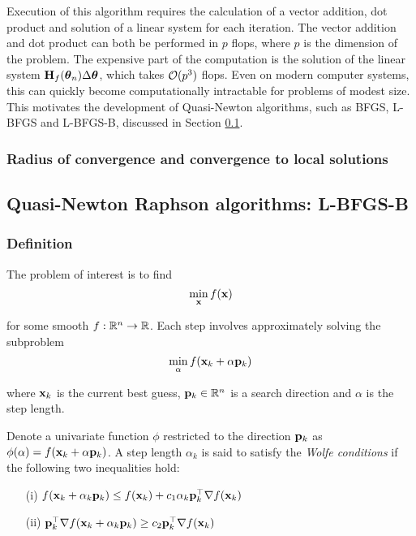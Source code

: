 \documentclass{amsart}[12pt]
\begin{document}
Execution of this algorithm requires the calculation of a vector addition, dot product and solution of a
linear system for each iteration. The vector addition and dot product can both be performed in $p$ flops,
where $p$ is the dimension of the problem. The expensive part of the computation is the solution of the linear
system ${\bf H}_f({\boldsymbol \theta}_n) \Delta {\boldsymbol\theta}$, which takes ${\mathcal O}(p^3)$ flops. Even on modern computer systems, this
can quickly become computationally intractable for problems of modest size. This motivates the development
of Quasi-Newton algorithms, such as BFGS, L-BFGS and L-BFGS-B, discussed in Section \ref{sec:quasi_newton}.

\subsubsection{Radius of convergence and convergence to local solutions}

\subsection{Quasi-Newton Raphson algorithms: L-BFGS-B}
\label{sec:quasi_newton}

\subsubsection{Definition}

The problem of interest is to find
\[
	\min_{\bf x} f({\bf x})
\]

for some smooth $f: {\mathbb{R}}^n \to {\mathbb{R}}$. Each step involves approximately solving the subproblem
\[
	\min_\alpha f({\bf x}_k + \alpha {\bf p}_k)
\]

where ${\bf x}_k$ is the current best guess, ${\bf p}_k \in {\mathbb{R}}^n$ is a search direction and $\alpha$ is the
step length.

Denote a univariate function $\phi$ restricted to the direction ${\bf p}_k$ as
$\phi(\alpha) = f({\bf x}_k + \alpha {\bf p}_k)$. A step length $\alpha_k$ is said to satisfy the \emph{Wolfe conditions}
if the following two inequalities hold:

\begin{enumerate}
\item[(i)] $f({\bf x}_k + \alpha_k {\bf p}_k) \leq f({\bf x}_k) + c_1 \alpha_k {\bf p}_k^\top \nabla f({\bf x}_k)$ 
\item[(ii)] ${\bf p}_k^\top \nabla f({\bf x}_k + \alpha_k {\bf p}_k) \geq c_2 {\bf p}_k^\top \nabla f({\bf x}_k)$ 
\end{enumerate}
\end{document}
